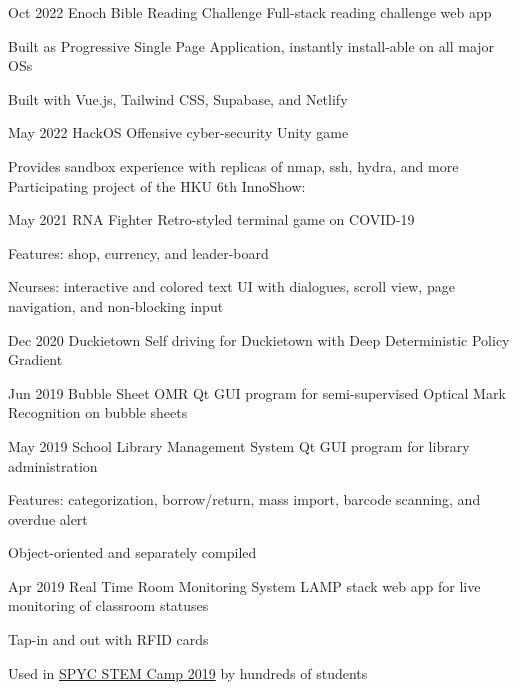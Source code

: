 \projectEntry
{Oct 2022}
{Enoch Bible Reading Challenge}
{Full-stack reading challenge web app}
{
\begin{descitemize}
	\item Built as Progressive Single Page Application, instantly install-able on all major OSs
    \item Built with Vue.js, Tailwind CSS, Supabase, and Netlify
\end{descitemize}
}

\projectEntry
{May 2022}
{HackOS}
{Offensive cyber-security Unity game}
{
\begin{descitemize}
    \item Provides sandbox experience with replicas of nmap, ssh, hydra, and more
    \specialitem Participating project of the HKU 6th InnoShow:
\end{descitemize}
}

\projectEntry
{May 2021}
{RNA Fighter}
{Retro-styled terminal game on COVID-19}
{
\begin{descitemize}
	\item Features: shop, currency, and leader-board
	\item Ncurses: interactive and colored text UI with dialogues, scroll view, page navigation, and non-blocking input
\end{descitemize}
}

\projectEntry
{Dec 2020}
{Duckietown}
{Self driving for Duckietown with Deep Deterministic Policy Gradient}
{}

\projectEntry
{Jun 2019}
{Bubble Sheet OMR}
{Qt GUI program for semi-supervised Optical Mark Recognition on bubble sheets}
{}

\projectEntry
{May 2019}
{School Library Management System}
{Qt GUI program for library administration}
{
\begin{descitemize}
    \item Features: categorization, borrow/return, mass import, barcode scanning, and overdue alert
    \item Object-oriented and separately compiled
\end{descitemize}
}

\projectEntry
{Apr 2019}
{\hypertarget{RTRMS}{Real Time Room Monitoring System}}
{LAMP stack web app for live monitoring of classroom statuses}
{
\begin{descitemize}
    \item Tap-in and out with RFID cards
    \item Used in \hyperlink{STEM_Camp_2019}{SPYC STEM Camp 2019} by hundreds of students
\end{descitemize}
}

